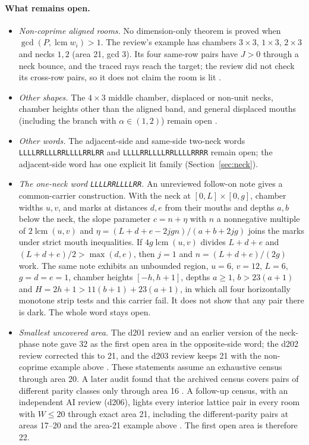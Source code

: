 \documentclass[11pt]{article}
\theoremstyle{definition}
\theoremstyle{remark}
\begin{document}
\paragraph{What remains open.}
\begin{itemize}
\item \emph{Non-coprime aligned rooms.} No dimension-only theorem is proved when
$\gcd(P,\operatorname{lcm}w_i)>1$. The review's example has chambers
$3\times 3$, $1\times 3$, $2\times 3$ and necks $1,2$ (area 21, gcd 3). Its four
same-row pairs have $J>0$ through a neck bounce, and the traced rays reach the
target; the review did not check its cross-row pairs, so it does not claim the
room is lit \cite{d203}.
\item \emph{Other shapes.} The $4\times 3$ middle chamber, displaced or non-unit
necks, chamber heights other than the aligned band, and general displaced mouths
(including the branch with $\alpha\in(1,2)$) remain open \cite{d202,d203}.
\item \emph{Other words.} The adjacent-side and same-side two-neck words
\texttt{LLLLRRLLLRRLLLLRRLRR} and \texttt{LLLLRRLLLLRRLLLLRRRR} remain open; the
adjacent-side word has one explicit lit family (Section~\ref{sec:neck}).
\item \emph{The one-neck word \texttt{LLLLRRLLLLRR}.} An unreviewed follow-on
note \cite{R6} gives a common-carrier construction. With the neck at
$[0,L]\times[0,g]$, chamber widths $u,v$, and marks at distances $d,e$ from their
mouths and depths $a,b$ below the neck, the slope parameter
$c=n+\eta$ with $n$ a nonnegative multiple of $2\operatorname{lcm}(u,v)$ and
$\eta=(L+d+e-2jgn)/(a+b+2jg)$ joins the marks under strict mouth inequalities.
If $4g\operatorname{lcm}(u,v)$ divides $L+d+e$ and $(L+d+e)/2>\max(d,e)$, then
$j=1$ and $n=(L+d+e)/(2g)$ work. The same note exhibits an unbounded region,
$u=6$, $v=12$, $L=6$, $g=d=e=1$, chamber heights $[-h,h+1]$, depths $a\ge 1$,
$b>23(a+1)$ and $H=2h+1>11(b+1)+23(a+1)$, in which all four horizontally monotone
strip tests and this carrier fail. It does not show that any pair there is dark.
The whole word stays open.
\item \emph{Smallest uncovered area.} The d201 review and an earlier version of
the neck-phase note gave 32 as the first open area in the opposite-side word;
the d202 review corrected this to 21, and
the d203 review keeps 21 with the non-coprime example above
\cite{d202,d203}. These statements assume an exhaustive census through area 20.
A later audit found that the archived census covers pairs of different parity
classes only through area 16 \cite{audit}.
A follow-up census, with an independent AI review (d206), lights every interior
lattice pair in every room with $W\le 20$ through exact area 21, including
the different-parity pairs at areas 17--20 and the area-21 example above
\cite{d205}. The first open area is therefore 22.
\end{itemize}
\end{document}
